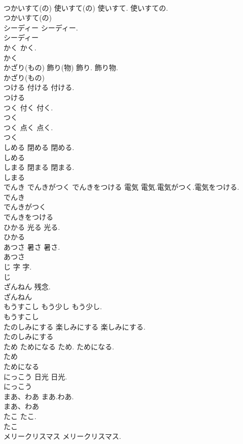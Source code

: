 \documentclass[8pt]{extreport}
\begin{document}
\begin{CJK}{UTF8}{min}
\\	つかいすて(の)	使いすて(の)	使いすて. 使いすての.	
\\	つかいすて(の)
\\	シーディー		シーディー.	
\\	シーディー
\\	かく		かく.	
\\	かく
\\	かざり(もの)	飾り(物)	飾り. 飾り物.	
\\	かざり(もの)
\\	つける	付ける	付ける.	
\\	つける
\\	つく	付く	付く.	
\\	つく
\\	つく	点く	点く.	
\\	つく
\\	しめる	閉める	閉める.	
\\	しめる
\\	しまる	閉まる	閉まる.	
\\	しまる
\\	でんき でんきがつく でんきをつける	電気	電気.電気がつく.電気をつける.	
\\	でんき
\\	でんきがつく
\\	でんきをつける
\\	ひかる	光る	光る.	
\\	ひかる
\\	あつさ	暑さ	暑さ.	
\\	あつさ
\\	じ	字	字.	
\\	じ
\\	ざんねん		残念.	
\\	ざんねん
\\	もうすこし	もう少し	もう少し.	
\\	もうすこし
\\	たのしみにする	楽しみにする	楽しみにする.	
\\	たのしみにする
\\	ため ためになる		ため. ためになる.	
\\	ため
\\	ためになる
\\	にっこう	日光	日光.	
\\	にっこう
\\	まあ、わあ		まあ.わあ.	
\\	まあ、わあ
\\	たこ		たこ.	
\\	たこ
\\	メリークリスマス		メリークリスマス.	

\end{CJK}
\end{document}
